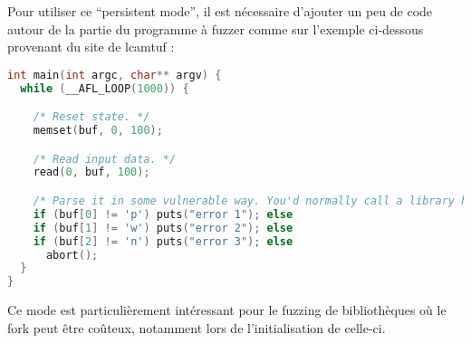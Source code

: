 Pour utiliser ce ``persistent mode'', il est nécessaire d'ajouter un peu de code autour de la partie du programme à fuzzer comme sur l'exemple ci-dessous provenant du site de lcamtuf :

\begin{lstlisting}[language=C]
int main(int argc, char** argv) {
  while (__AFL_LOOP(1000)) {

    /* Reset state. */
    memset(buf, 0, 100);

    /* Read input data. */
    read(0, buf, 100);

    /* Parse it in some vulnerable way. You'd normally call a library here. */
    if (buf[0] != 'p') puts("error 1"); else
    if (buf[1] != 'w') puts("error 2"); else
    if (buf[2] != 'n') puts("error 3"); else
      abort();
  }
}
\end{lstlisting}

Ce mode est particulièrement intéressant pour le fuzzing de bibliothèques où le fork peut être coûteux, notamment lors de l'initialisation de celle-ci.
